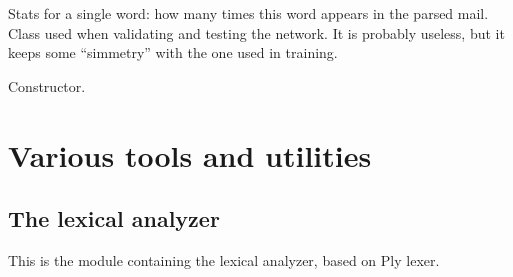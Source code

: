 \documentclass[letterpaper,10pt,english]{sphinxmanual}
\begin{document}
\begin{fulllineitems}
\label{index:test_stat.Test_word}
Stats for a single word: how many times this word appears in the parsed
mail. Class used when validating and testing the network. It is probably
useless, but it keeps some ``simmetry'' with the one used in training.

\begin{fulllineitems}
\label{index:test_stat.Test_word.__init__}
Constructor.

\end{fulllineitems}


\end{fulllineitems}



\chapter{Various tools and utilities}
\label{index:various-tools-and-utilities}

\section{The lexical analyzer}
\label{index:the-lexical-analyzer}
This is the module containing the lexical analyzer, based on Ply lexer.
\label{index:module-lexer}
\end{document}
